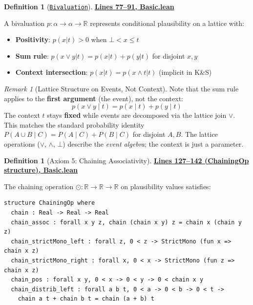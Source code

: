 \documentclass[11pt]{article}
\theoremstyle{definition}
\newtheorem{definition}[theorem]{Definition}
\theoremstyle{remark}
\newtheorem{remark}[theorem]{Remark}
\begin{document}
\begin{definition}[\href{https://github.com/zariuq/ks-foundations-of-inference/blob/main/KnuthSkilling/Probability/ConditionalProbability/Basic.lean\#L77}{\texttt{Bivaluation}}]
\textbf{\href{https://github.com/zariuq/ks-foundations-of-inference/blob/main/KnuthSkilling/Probability/ConditionalProbability/Basic.lean\#L77-L91}{Lines 77--91, Basic.lean}}

A bivaluation $p : \alpha \to \alpha \to \mathbb{R}$ represents conditional plausibility on a lattice with:
\begin{itemize}
\item \textbf{Positivity}: $p(x|t) > 0$ when $\bot < x \leq t$
\item \textbf{Sum rule}: $p(x \vee y|t) = p(x|t) + p(y|t)$ for disjoint $x, y$
\item \textbf{Context intersection}: $p(x|t) = p(x \wedge t|t)$ (implicit in K\&S)
\end{itemize}
\end{definition}

\begin{remark}[Lattice Structure on Events, Not Context]
Note that the sum rule applies to the \textbf{first argument} (the event), not the context:
\[ p(x \vee y \mid t) = p(x \mid t) + p(y \mid t) \]
The context $t$ stays \textbf{fixed} while events are decomposed via the lattice join $\vee$.
This matches the standard probability identity $P(A \cup B \mid C) = P(A \mid C) + P(B \mid C)$ for disjoint $A, B$.
The lattice operations ($\vee$, $\wedge$, $\bot$) describe the \emph{event algebra}; the context is just a parameter.
\end{remark}

\begin{definition}[Axiom 5: Chaining Associativity]
\textbf{\href{https://github.com/zariuq/ks-foundations-of-inference/blob/main/KnuthSkilling/Probability/ConditionalProbability/Basic.lean\#L127-L142}{Lines 127--142 (ChainingOp structure), Basic.lean}}

The chaining operation $\odot : \mathbb{R} \to \mathbb{R} \to \mathbb{R}$ on plausibility values satisfies:
\end{definition}

\begin{lstlisting}[caption={\texttt{ChainingOp} structure (\href{https://github.com/zariuq/ks-foundations-of-inference/blob/main/KnuthSkilling/Probability/ConditionalProbability/Basic.lean\#L127}{Basic.lean:127})},numbers=none]
structure ChainingOp where
  chain : Real -> Real -> Real
  chain_assoc : forall x y z, chain (chain x y) z = chain x (chain y z)
  chain_strictMono_left : forall z, 0 < z -> StrictMono (fun x => chain x z)
  chain_strictMono_right : forall x, 0 < x -> StrictMono (fun z => chain x z)
  chain_pos : forall x y, 0 < x -> 0 < y -> 0 < chain x y
  chain_distrib_left : forall a b t, 0 < a -> 0 < b -> 0 < t ->
    chain a t + chain b t = chain (a + b) t
\end{lstlisting}
\end{document}
